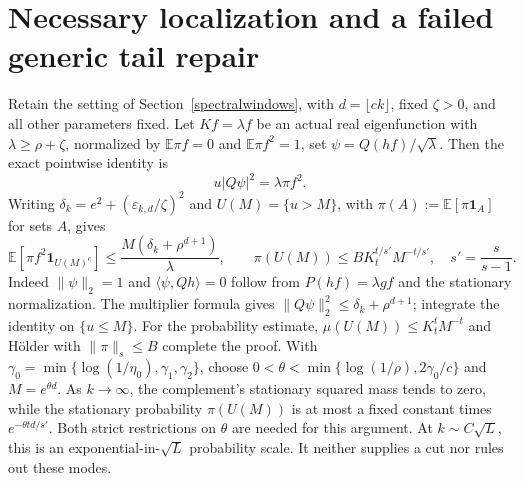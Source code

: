 \documentclass[11pt]{article}
\newcommand{\E}{\mathbb E}
\begin{document}
\section{Necessary localization and a failed generic tail repair}\label{localization}
Retain the setting of Section~\ref{spectralwindows}, with $d=\lfloor ck\rfloor$, fixed $\zeta>0$, and all other parameters fixed. Let $Kf=\lambda f$ be an actual real eigenfunction with $\lambda\ge\rho+\zeta$, normalized by
$\mathbb E\pi f=0$ and $\mathbb E\pi f^2=1$, set
$\psi=Q(hf)/\sqrt\lambda$. Then the exact pointwise identity is
\[
 u|Q\psi|^2=\lambda\pi f^2.
\]
Writing $\delta_k=e^2+(\varepsilon_{k,d}/\zeta)^2$ and
$U(M)=\{u>M\}$, with $\pi(A):=\E[\pi\mathbf1_A]$ for sets $A$, gives
\[
 \mathbb E[\pi f^2\mathbf1_{U(M)^c}]
 \le\frac{M(\delta_k+\rho^{d+1})}{\lambda},\qquad
 \pi(U(M))\le B K_t^{t/s'}M^{-t/s'},\quad s'=\frac{s}{s-1}.
\]
Indeed $\|\psi\|_2=1$ and $\langle\psi,Qh\rangle=0$ follow from $P(hf)=\lambda gf$ and the stationary normalization. The multiplier formula gives $\|Q\psi\|_2^2\le\delta_k+\rho^{d+1}$; integrate the identity on $\{u\le M\}$. For the probability estimate, $\mu(U(M))\le K_t^t M^{-t}$ and H\"older with $\|\pi\|_s\le B$ complete the proof. With
$\gamma_0=\min\{\log(1/\eta_0),\gamma_1,\gamma_2\}$, choose
$0<\theta<\min\{\log(1/\rho),2\gamma_0/c\}$ and
$M=e^{\theta d}$. As $k\to\infty$, the complement's stationary squared mass tends to zero,
while the stationary probability $\pi(U(M))$ is at most a fixed constant times $e^{-\theta td/s'}$.
Both strict restrictions on $\theta$ are needed for this argument.
At $k\sim C\sqrt L$, this is an exponential-in-$\sqrt L$ probability
scale. It neither supplies a cut nor rules out these modes.
\end{document}
